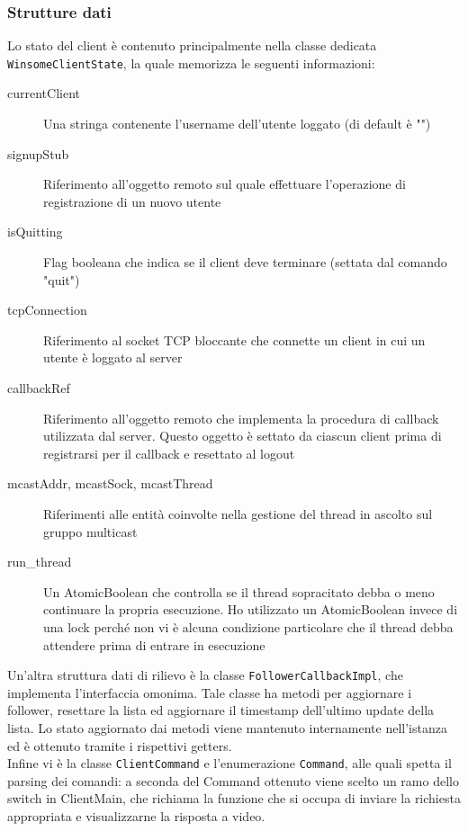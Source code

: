 \subsubsection{Strutture dati}
Lo stato del client è contenuto principalmente nella classe dedicata \verb|WinsomeClientState|, la quale memorizza le seguenti informazioni:
\begin{description}
	\item[currentClient] Una stringa contenente l'username dell'utente loggato (di default è "")
	\item[signupStub] Riferimento all'oggetto remoto sul quale effettuare l'operazione di registrazione di un nuovo utente
	\item[isQuitting] Flag booleana che indica se il client deve terminare (settata dal comando "quit")
	\item[tcpConnection] Riferimento al socket TCP bloccante che connette un client in cui un utente è loggato al server
	\item[callbackRef] Riferimento all'oggetto remoto che implementa la procedura di callback utilizzata dal server. Questo oggetto è settato da ciascun client prima di registrarsi per il callback e resettato al logout
	\item[mcastAddr, mcastSock, mcastThread] Riferimenti alle entità coinvolte nella gestione del thread in ascolto sul gruppo multicast
	\item[run\_thread] Un AtomicBoolean che controlla se il thread sopracitato debba o meno continuare la propria esecuzione. Ho utilizzato un AtomicBoolean invece di una lock perché non vi è alcuna condizione particolare che il thread debba attendere prima di entrare in esecuzione
\end{description}

Un'altra struttura dati di rilievo è la classe \verb|FollowerCallbackImpl|, che implementa l'interfaccia omonima. Tale classe ha metodi per aggiornare i follower, resettare la lista ed aggiornare il timestamp dell'ultimo update della lista. Lo stato aggiornato dai metodi viene mantenuto internamente nell'istanza ed è ottenuto tramite i rispettivi getters.\\
Infine vi è la classe \verb|ClientCommand| e l'enumerazione \verb|Command|, alle quali spetta il parsing dei comandi: a seconda del Command ottenuto viene scelto un ramo dello switch in ClientMain, che richiama la funzione che si occupa di inviare la richiesta appropriata e visualizzarne la risposta a video.
